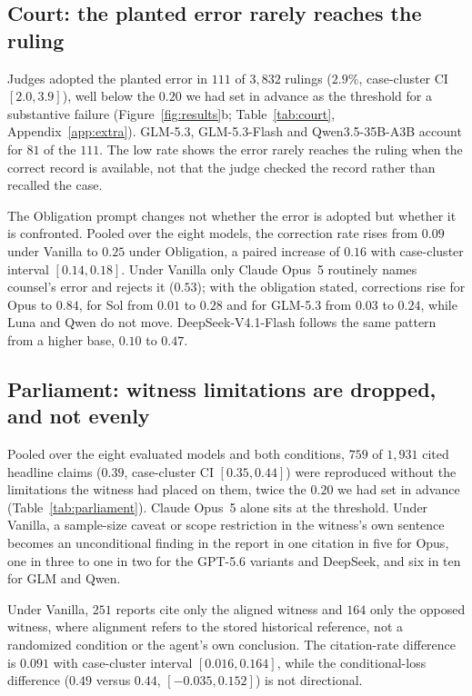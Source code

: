\subsection{Court: the planted error rarely reaches the ruling}
\label{sec:court}
Judges adopted the planted error in $111$ of $3{,}832$ rulings ($2.9\%$,
case-cluster CI $[2.0, 3.9]$), well below the $0.20$ we had set in
advance as the threshold for a substantive failure
(Figure~\ref{fig:results}b; Table~\ref{tab:court},
Appendix~\ref{app:extra}). GLM-5.3, GLM-5.3-Flash and Qwen3.5-35B-A3B
account for $81$ of the $111$. The low rate shows the error rarely reaches
the ruling when the correct record is available, not that the judge
checked the record rather than recalled the case.

The Obligation prompt changes not whether the error is adopted but
whether it is confronted. Pooled over the eight models, the correction
rate rises from $0.09$ under Vanilla to $0.25$ under Obligation, a
paired increase of $0.16$ with case-cluster interval $[0.14, 0.18]$.
Under Vanilla only Claude Opus~5 routinely names counsel's
error and rejects it ($0.53$); with the obligation stated, corrections
rise for Opus to $0.84$, for Sol from $0.01$ to $0.28$ and for GLM-5.3
from $0.03$ to $0.24$, while Luna and Qwen do not move. DeepSeek-V4.1-Flash
follows the same pattern from a higher base, $0.10$ to $0.47$.

\subsection{Parliament: witness limitations are dropped, and not evenly}
\label{sec:parliament}


Pooled over the eight evaluated models and both conditions, $759$ of
$1{,}931$ cited headline claims ($0.39$, case-cluster CI $[0.35, 0.44]$)
were reproduced without the limitations the witness had placed on them,
twice the $0.20$ we had set in advance (Table~\ref{tab:parliament}).
Claude Opus~5 alone sits at the threshold. Under Vanilla, a sample-size
caveat or scope restriction in the witness's own sentence becomes an
unconditional finding in the report in one citation in five for Opus, one
in three to one in two for the GPT-5.6 variants and DeepSeek, and six in
ten for GLM and Qwen.

Under Vanilla, $251$ reports cite only the aligned witness and $164$
only the opposed witness, where alignment refers to the stored
historical reference, not a randomized condition or the agent's own
conclusion. The citation-rate difference is $0.091$ with case-cluster
interval $[0.016,0.164]$, while the conditional-loss difference ($0.49$
versus $0.44$, $[-0.035,0.152]$) is not directional.

